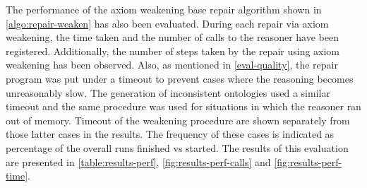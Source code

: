 
The performance of the axiom weakening base repair algorithm shown in \cref{algo:repair-weaken} has also been evaluated. During each repair via axiom weakening, the time taken and the number of calls to the reasoner have been registered. Additionally, the number of steps taken by the repair using axiom weakening has been observed. Also, as mentioned in \cref{eval-quality}, the repair program was put under a timeout to prevent cases where the reasoning becomes unreasonably slow. The generation of inconsistent ontologies used a similar timeout and the same procedure was used for situations in which the reasoner ran out of memory. Timeout of the weakening procedure are shown separately from those latter cases in the results. The frequency of these cases is indicated as percentage of the overall runs finished vs started. The results of this evaluation are presented in \cref{table:results-perf}, \cref{fig:results-perf-calls} and \cref{fig:results-perf-time}.

